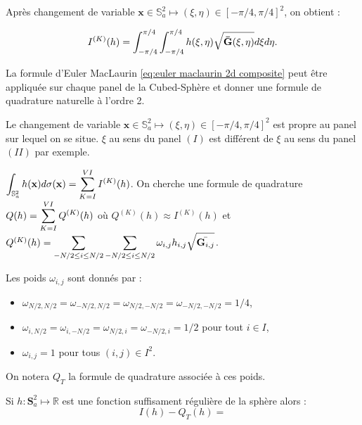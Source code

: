 Après changement de variable $\mathbf{x} \in \mathbb{S}_a^2 \mapsto (\xi, \eta) \in [-\pi/4, \pi/4]^2$, on obtient :

\begin{equation}
I^{(K)}(h) = \displaystyle\int_{-\pi/4}^{\pi/4}\displaystyle\int_{-\pi/4}^{\pi/4} h(\xi, \eta) \sqrt{\mathbf{\bar{G}}(\xi, \eta)} d \xi d \eta.
\end{equation}

La formule d'Euler MacLaurin \eqref{eq:euler maclaurin 2d composite} peut être appliquée sur chaque panel de la Cubed-Sphère et donner une formule de quadrature naturelle à l'ordre 2.

\begin{remarque}
Le changement de variable $\mathbf{x} \in \mathbb{S}_a^2 \mapsto (\xi, \eta) \in [-\pi/4, \pi/4]^2$ est propre au panel sur lequel on se situe. $\xi$ au sens du panel $(I)$ est différent de $\xi$ au sens du panel $(II)$ par exemple.
\end{remarque}

$\displaystyle\int_{\mathbb{S}_a^2}h(\mathbf{x}) d \sigma (\mathbf{x}) = \displaystyle\sum\limits_{K = I}^{VI} I^{(K)}(h)$. On cherche une formule de quadrature $Q(h) = \displaystyle\sum\limits_{K = I}^{VI} Q^{(K)}(h) $ où $Q^{(K)}(h) \approx I^{(K)}(h)$ et $Q^{(K)}(h) = \displaystyle\sum\limits_{-N/2 \leq i \leq N/2} \displaystyle\sum\limits_{-N/2 \leq i \leq N/2} \omega_{i,j} h_{i,j} \sqrt{\bar{\mathbf{G}_{i,j}}}$.

Les poids $\omega_{i,j}$ sont donnés par :
\begin{itemize}
\item $\omega_{N/2,N/2}=\omega_{-N/2,N/2}=\omega_{N/2,-N/2}=\omega_{-N/2,-N/2}=1/4$,
\item $\omega_{i,N/2}=\omega_{i,-N/2}=\omega_{N/2,i}=\omega_{-N/2,i}=1/2$ pour tout $i \in I$,
\item $\omega_{i,j} = 1$ pour tous $(i,j) \in I^2$.
\end{itemize}

On notera $Q_T$ la formule de quadrature associée à ces poids.

\begin{theoreme}
Si $h : \mathbf{S}_a^2 \mapsto \mathbb{R}$ est une fonction suffisament régulière de la sphère alors :
\begin{equation}
I(h)-Q_T(h)=
\end{equation}
\end{theoreme}
























